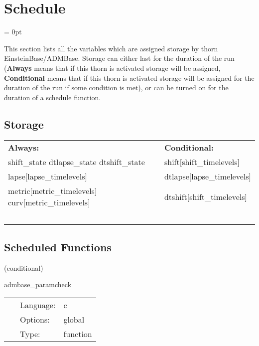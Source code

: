 \documentclass{article}
\begin{document}
\section{Schedule} 


\parskip = 0pt


\noindent This section lists all the variables which are assigned storage by thorn EinsteinBase/ADMBase.  Storage can either last for the duration of the run ({\bf Always} means that if this thorn is activated storage will be assigned, {\bf Conditional} means that if this thorn is activated storage will be assigned for the duration of the run if some condition is met), or can be turned on for the duration of a schedule function.


\subsection*{Storage}

\hspace{5mm}

 \begin{tabular*}{160mm}{ll} 

{\bf Always:}& {\bf Conditional:} \\ 
 shift\_state dtlapse\_state dtshift\_state &  shift[shift\_timelevels]\\ 
 lapse[lapse\_timelevels] &  dtlapse[lapse\_timelevels]\\ 
 metric[metric\_timelevels] curv[metric\_timelevels] &  dtshift[shift\_timelevels]\\ 
~ & ~\\ 
\end{tabular*} 


\subsection*{Scheduled Functions}
\vspace{5mm}

   (conditional) 

\hspace{5mm} admbase\_paramcheck 

\hspace{5mm}{\it check consistency of parameters } 


\hspace{5mm}

 \begin{tabular*}{160mm}{cll} 
~ & Language:  & c \\ 
~ & Options:  & global \\ 
~ & Type:  & function \\ 
\end{tabular*} 
\end{document}
